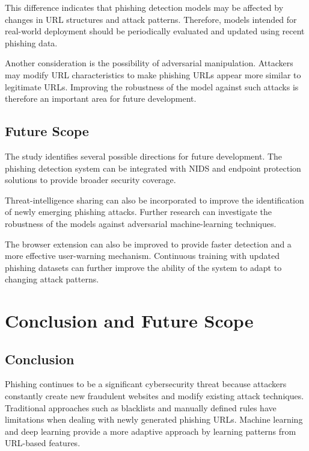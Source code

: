 \documentclass[12pt,a4paper]{report}
\begin{document}
This difference indicates that phishing detection models may be affected by changes in URL structures and attack patterns. Therefore, models intended for real-world deployment should be periodically evaluated and updated using recent phishing data.

Another consideration is the possibility of adversarial manipulation. Attackers may modify URL characteristics to make phishing URLs appear more similar to legitimate URLs. Improving the robustness of the model against such attacks is therefore an important area for future development.

\section{Future Scope}

The study identifies several possible directions for future development. The phishing detection system can be integrated with NIDS and endpoint protection solutions to provide broader security coverage.

Threat-intelligence sharing can also be incorporated to improve the identification of newly emerging phishing attacks. Further research can investigate the robustness of the models against adversarial machine-learning techniques.

The browser extension can also be improved to provide faster detection and a more effective user-warning mechanism. Continuous training with updated phishing datasets can further improve the ability of the system to adapt to changing attack patterns.


\chapter{Conclusion and Future Scope}

\section{Conclusion}

Phishing continues to be a significant cybersecurity threat because attackers constantly create new fraudulent websites and modify existing attack techniques. Traditional approaches such as blacklists and manually defined rules have limitations when dealing with newly generated phishing URLs. Machine learning and deep learning provide a more adaptive approach by learning patterns from URL-based features.
\end{document}
